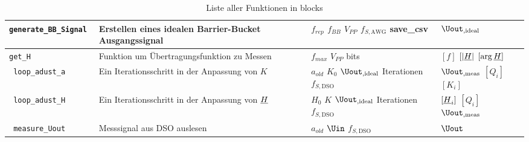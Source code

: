 \documentclass[../Report.tex]{subfiles}
\begin{document}
\begin{table}[H]
\begin{tabular}[t]{| >{\texttt\bgroup}m{3.5cm}<{\egroup}|m{8cm}|m{2cm}|m{2cm}|}
  \hline
  generate\_BB\_Signal & Erstellen eines idealen Barrier-Bucket Ausgangssignal & $f_{rep}$ \newline $f_{BB}$ \newline $V_{PP}$ \newline $f_{S,\textrm{AWG}}$ \newline save\_csv & $\Uout_{,\textrm{ideal}}$\\
  \hline
  get\_H & Funktion um Übertragungsfunktion zu Messen & $f_{max}$ \newline $V_{PP}$ \newline bits & $[f]$ \newline $[|\underline{H}|$ \newline $[\arg{\underline{H}}]$\\
  \hline
  loop\_adust\_a & Ein Iterationsschritt in der Anpassung von $K$ & $a_{old}$ \newline $K_0$ \newline $\Uout_{,\textrm{ideal}}$ \newline Iterationen \newline $f_{S,\textrm{DSO}}$ & $\Uout_{,\textrm{meas}}$ \newline$[Q_i]$ \newline $[K_i]$\\
  \hline
  loop\_adust\_H & Ein Iterationsschritt in der Anpassung von $\underline{H}$ & $H_0$ \newline $K$ \newline $\Uout_{,\textrm{ideal}}$ \newline Iterationen \newline $f_{S,\textrm{DSO}}$ & $[\underline{H}_i]$ \newline $[Q_i]$ \newline $\Uout_{,\textrm{meas}}$\\
  \hline
  measure\_Uout & Messsignal aus DSO auslesen & $a_{old}$ \newline $\Uin$ \newline $f_{S,\textrm{DSO}}$ & $\Uout$\\
  \hline
\end{tabular}
\caption{Liste aller Funktionen in blocks}
\label{tab:anhang.Funktionen.blocks}
\end{table}
\end{document}
